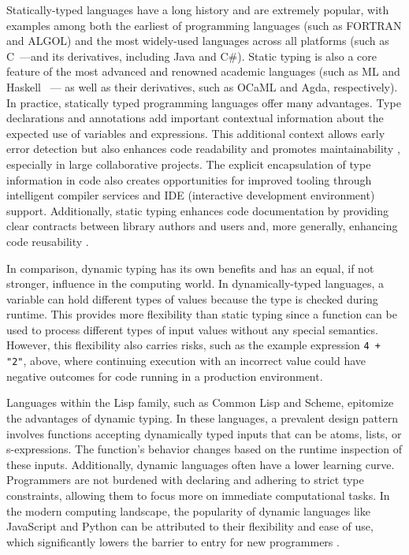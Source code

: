 Statically-typed languages have a long history and are extremely popular, with examples among both the earliest of programming languages (such as FORTRAN \cite{Backus1978-xt} and ALGOL) and the most widely-used languages across all platforms (such as C~\cite{Ritchie1978-pa}---and its derivatives, including Java and C\#). Static typing is also a core feature of the most advanced and renowned academic languages (such as ML and Haskell~\cite{Hudak2007-kn} --- as well as their derivatives, such as OCaML and Agda, respectively). In practice, statically typed programming languages offer many advantages. Type declarations and annotations add important contextual information about the expected use of variables and expressions. This additional context allows early error detection but also enhances code readability and promotes maintainability \cite{Kleinschmager2012-bg}, especially in large collaborative projects. The explicit encapsulation of type information in code also creates opportunities for improved tooling through intelligent compiler services and IDE (interactive development environment) support. Additionally, static typing enhances code documentation by providing clear contracts between library authors and users and, more generally, enhancing code reusability \cite{Endrikat2014-uz}.


In comparison, dynamic typing has its own benefits and has an equal, if not stronger, influence in the computing world. In dynamically-typed languages, a variable can hold different types of values because the type is checked during runtime. This provides more flexibility than static typing since a function can be used to process different types of input values without any special semantics. However, this flexibility also carries risks, such as the example expression \texttt{4 + "2"}, above, where continuing execution with an incorrect value could have negative outcomes for code running in a production environment.

Languages within the Lisp family, such as Common Lisp and Scheme, epitomize the advantages of dynamic typing. In these languages, a prevalent design pattern involves functions accepting dynamically typed inputs that can be atoms, lists, or s-expressions. The function's behavior changes based on the runtime inspection of these inputs. Additionally, dynamic languages often have a lower learning curve. Programmers are not burdened with declaring and adhering to strict type constraints, allowing them to focus more on immediate computational tasks. In the modern computing landscape, the popularity of dynamic languages like JavaScript and Python can be attributed to their flexibility and ease of use, which significantly lowers the barrier to entry for new programmers \cite{Chatley2019-uq}.


